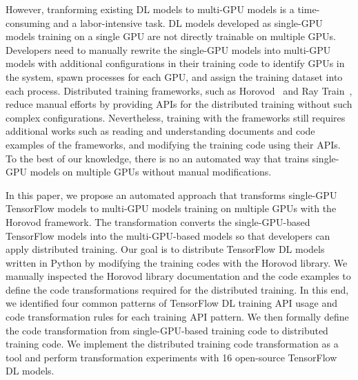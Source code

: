 However, tranforming existing DL models to multi-GPU models is a time-consuming
and a labor-intensive task.
DL models developed as single-GPU models training on a single GPU are not
directly trainable on multiple GPUs. 
Developers need to manually rewrite the single-GPU models into multi-GPU models
with additional configurations in their training code to identify GPUs in the
system, spawn processes for each GPU, and assign the training dataset into each
process.
Distributed training frameworks, such as Horovod~\cite{sergeev2018horovod} and
Ray Train~\cite{raytrain}, reduce manual efforts by providing APIs for the
distributed training without such complex configurations.
Nevertheless, training with the frameworks still requires additional works such
as reading and understanding documents and code examples of the frameworks, and
modifying the training code using their APIs.
To the best of our knowledge, there is no an automated way that trains
single-GPU models on multiple GPUs without manual modifications.




In this paper, we propose an automated approach that transforms single-GPU
TensorFlow models to multi-GPU models training on multiple GPUs with the
Horovod framework.
The transformation converts the single-GPU-based TensorFlow models into the
multi-GPU-based models so that developers can apply distributed training.
Our goal is to distribute TensorFlow DL models written in Python by modifying
the training codes with the Horovod library.
We manually inspected the Horovod library documentation and the code examples
to define the code transformations required for the distributed training. In
this end, we identified four common patterns of TensorFlow DL training API
usage and code transformation rules for each training API pattern. 
We then formally define the code transformation from single-GPU-based training
code to distributed training code.
We implement the distributed training code transformation as a tool and perform
transformation experiments with 16 open-source TensorFlow DL models. 

